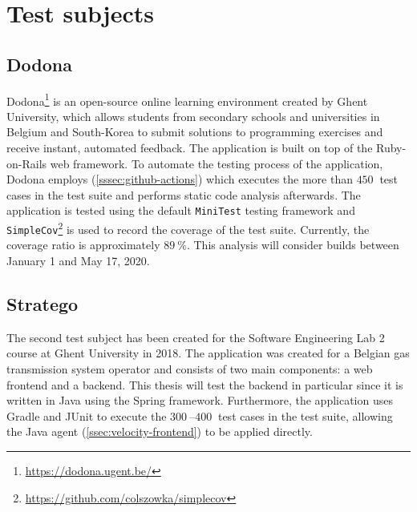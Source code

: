 
\section{Test subjects}

\subsection{Dodona}
Dodona\footnote{\url{https://dodona.ugent.be/}} is an open-source online learning environment created by Ghent University, which allows students from secondary schools and universities in Belgium and South-Korea to submit solutions to programming exercises and receive instant, automated feedback. The application is built on top of the Ruby-on-Rails web framework. To automate the testing process of the application, Dodona employs \githubactions{} (\cref{sssec:github-actions}) which executes the more than $\SI{450}{}$ test cases in the test suite and performs static code analysis afterwards. The application is tested using the default \texttt{MiniTest} testing framework and \texttt{SimpleCov}\footnote{\url{https://github.com/colszowka/simplecov}} is used to record the coverage of the test suite. Currently, the coverage ratio is approximately $\SI{89}{\percent}$. This analysis will consider builds between January 1 and May 17, 2020.

\subsection{Stratego}
The second test subject has been created for the Software Engineering Lab 2 course at Ghent University in 2018. The application was created for a Belgian gas transmission system operator and consists of two main components: a web frontend and a backend. This thesis will test the backend in particular since it is written in Java using the Spring framework. Furthermore, the application uses Gradle and JUnit to execute the $\SIrange{300}{400}{}$ test cases in the test suite, allowing the Java agent (\cref{ssec:velocity-frontend}) to be applied directly.